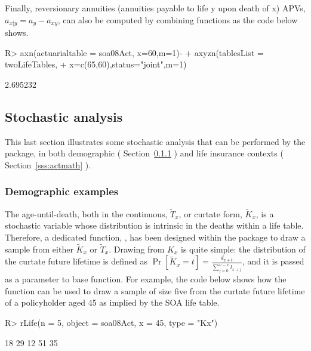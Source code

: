 \documentclass[nojss]{jss}
\begin{document}
Finally, reversionary annuities (annuities payable to life y upon death of x)
APVs, $a_{x|y}=a_{y} - a_{xy}$, can also be computed by combining
 functions as the code below shows.

\begin{Schunk}
\begin{Sinput}
R> axn(actuarialtable = soa08Act, x=60,m=1)-
+  		axyzn(tablesList = twoLifeTables, 
+  				x=c(65,60),status="joint",m=1)
\end{Sinput}
\begin{Soutput}
[1] 2.695232
\end{Soutput}
\end{Schunk}


\subsection{Stochastic analysis}\label{ss:stochastic}
This last section illustrates some stochastic analysis that can be performed by the 
 package, in both demographic (
Section~\ref{sss:demo} ) and life insurance contexts (
Section~\ref{sss:actmath} ).\\

\subsubsection{Demographic examples}\label{sss:demo}

The age-until-death, both in the continuous, $\tilde T_x$,  or curtate form, $\tilde K_x$, is a stochastic variable whose 
distribution is intrinsic in the deaths within a life table.  Therefore, a
dedicated function, , has been designed within
the  package to draw a sample from either  $\tilde K_x$ or $\tilde T_x$. Drawing from $K_x$ is quite simple: the distribution of the curtate future lifetime is defined as
$\Pr \left[ {{{\tilde K}_x} = t} \right] = \frac{{{d_{x + t}}}}{{\sum\limits_{j = 0}^{\omega  - x} {{l_{x + j}}} }}$, and it is passed as a
 parameter to base   function. For example,
the code below shows how the  function can be used to draw a sample of
size five from the curtate future lifetime of a policyholder aged 45 as implied by
the SOA life table.

\begin{Schunk}
\begin{Sinput}
R> rLife(n = 5, object = soa08Act, x = 45, type = "Kx")
\end{Sinput}
\begin{Soutput}
[1] 18 29 12 51 35
\end{Soutput}
\end{Schunk}
\end{document}
